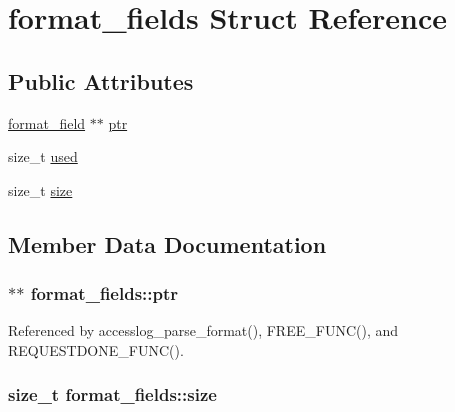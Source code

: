 \hypertarget{structformat__fields}{\section{format\-\_\-fields Struct Reference}
\label{structformat__fields}
}
\subsection*{Public Attributes}
\begin{DoxyCompactItemize}
\item 
\hyperlink{structformat__field}{format\-\_\-field} $\ast$$\ast$ \hyperlink{structformat__fields_a627b5df2e78438b67f825f38d9a21b21}{ptr}
\item 
size\-\_\-t \hyperlink{structformat__fields_ab0dab4eaa6b3d9ea8966650ab73e41b0}{used}
\item 
size\-\_\-t \hyperlink{structformat__fields_aaf5d279fbbd703f3f7885e12eace18d5}{size}
\end{DoxyCompactItemize}


\subsection{Member Data Documentation}
\hypertarget{structformat__fields_a627b5df2e78438b67f825f38d9a21b21}{
\subsubsection[{ptr}]{$\ast$$\ast$ format\-\_\-fields\-::ptr}}\label{structformat__fields_a627b5df2e78438b67f825f38d9a21b21}


Referenced by accesslog\-\_\-parse\-\_\-format(), F\-R\-E\-E\-\_\-\-F\-U\-N\-C(), and R\-E\-Q\-U\-E\-S\-T\-D\-O\-N\-E\-\_\-\-F\-U\-N\-C().

\hypertarget{structformat__fields_aaf5d279fbbd703f3f7885e12eace18d5}{
\subsubsection[{size}]{\setlength{\rightskip}{0pt plus 5cm}size\-\_\-t format\-\_\-fields\-::size}}\label{structformat__fields_aaf5d279fbbd703f3f7885e12eace18d5}


